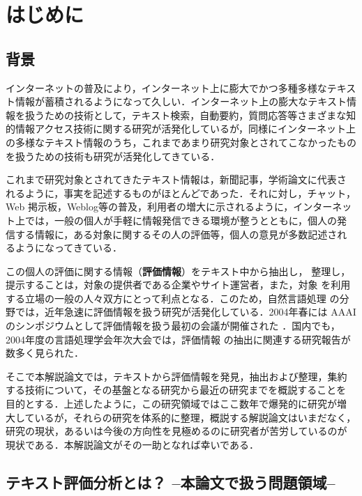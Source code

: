 \maketitle
\thispagestyle{empty}


\section{はじめに}
\label{sec:hajimeni}

\subsection{背景}

インターネットの普及により，インターネット上に膨大でかつ多種多様なテキス
ト情報が蓄積されるようになって久しい．インターネット上の膨大なテキスト情
報を扱うための技術として，テキスト検索，自動要約，質問応答等さまざまな知
的情報アクセス技術に関する研究が活発化しているが，同様にインターネット上
の多様なテキスト情報のうち，これまであまり研究対象とされてこなかったもの
を扱うための技術も研究が活発化してきている．

これまで研究対象とされてきたテキスト情報は，新聞記事，学術論文に代表さ
れるように，事実を記述するものがほとんどであった．それに対し，チャット，
Web 掲示板，Weblog等の普及，利用者の増大に示されるように，インターネッ
ト上では，一般の個人が手軽に情報発信できる環境が整うとともに，個人の発
信する情報に，ある対象に関するその人の評価等，個人の意見が多数記述され
るようになってきている．

この個人の評価に関する情報（\textbf{評価情報}）をテキスト中から抽出し，
整理し，提示することは，対象の提供者である企業やサイト運営者，また，対象
を利用する立場の一般の人々双方にとって利点となる．このため，自然言語処理
の分野では，近年急速に評価情報を扱う研究が活発化している．2004年春には
AAAI のシンポジウムとして評価情報を扱う最初の会議が開催された
\cite{aaai2004a}．国内でも，2004年度の言語処理学会年次大会では，評価情報
の抽出に関連する研究報告が数多く見られた．

そこで本解説論文では，テキストから評価情報を発見，抽出および整理，集約
する技術について，その基盤となる研究から最近の研究までを概説することを
目的とする．上述したように，この研究領域ではここ数年で爆発的に研究が増
大しているが，それらの研究を体系的に整理，概説する解説論文はいまだなく，
研究の現状，あるいは今後の方向性を見極めるのに研究者が苦労しているのが
現状である．本解説論文がその一助となれば幸いである．

\subsection{テキスト評価分析とは？ --本論文で扱う問題領域--}

